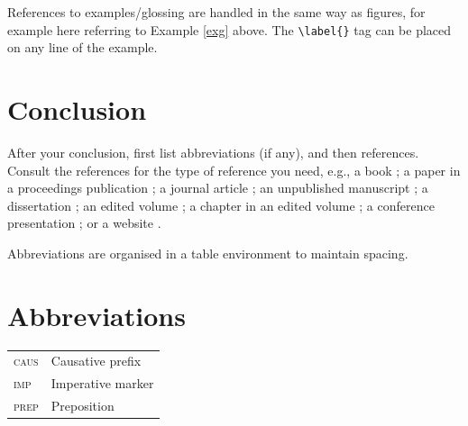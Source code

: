 References to examples/glossing are handled in the same way as figures, for example here referring to Example \ref{exg} above. The \texttt{\textbackslash label\{\}} tag can be placed on any line of the example.

\section{Conclusion}

After your conclusion, first list abbreviations (if any), and then references. Consult the references for the type of reference you need, e.g., a book \autocite{anderson2007munda}; a paper in a proceedings publication \autocite{delancey2002bodic}; a journal article \autocites{haokip2012thadou, peterson1998lai}; an unpublished manuscript \autocite{hyslop2010kurtop}; a dissertation \autocite{hyslop2011kurtop}; an edited volume \autocite{morey2008neil}; a chapter in an edited volume \autocite{peterson2003lai}; a conference presentation \autocite{post2008tani}; or a website \autocite{sadokpam2008meetei}.

Abbreviations are organised in a table environment to maintain spacing.

\section*{Abbreviations}

\vspace{-1em} %
\begin{table}[htpb!]
    \begin{tabular}{ll}
    \textsc{caus} & Causative prefix \\
    \textsc{imp} & Imperative marker \\
    \textsc{prep} & Preposition
	\end{tabular}
\end{table}



